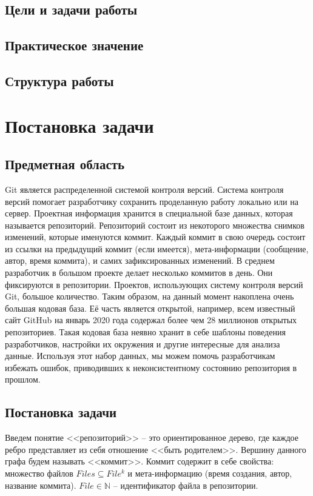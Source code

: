 \documentclass[times]{itmo-student-thesis}
\begin{document}
\section{Цели и задачи работы}
\section{Практическое значение}
\section{Структура работы}
\chapter{Постановка задачи}
\section{Предметная область}
Git является распределенной системой контроля версий. Система контроля версий помогает разработчику сохранить проделанную работу локально или на сервер. Проектная информация хранится в специальной базе данных, которая называется репозиторий. Репозиторий состоит из некоторого множества снимков изменений, которые именуются коммит. Каждый коммит в свою очередь состоит из ссылки на предыдущий коммит (если имеется), мета-информации (сообщение, автор, время коммита), и самих зафиксированных изменений. В среднем разработчик в большом проекте делает несколько коммитов в день. Они фиксируются в репозитории. Проектов, использующих систему контроля версий Git, большое количество. Таким образом, на данный момент накоплена очень большая кодовая база. Её часть является открытой, например, всем известный сайт GitHub на январь 2020 года содержал более чем 28 миллионов открытых репозиториев. Такая кодовая база неявно хранит в себе шаблоны поведения разработчиков, настройки их окружения и другие интересные для анализа данные. Используя этот набор данных, мы можем помочь разработчикам избежать ошибок, приводивших к неконсистентному состоянию репозитория в прошлом.
\section{Постановка задачи}
Введем понятие <<репозиторий>> -- это ориентированное дерево, где каждое ребро представляет из себя отношение <<быть родителем>>. Вершину данного графа будем называть <<коммит>>. Коммит содержит в себе свойства: множество файлов $Files \subseteq File^k$ и мета-информацию (время создания, автор, название коммита). $File \in \mathbb{N}$ -- идентификатор файла в репозитории.\\
\end{document}

